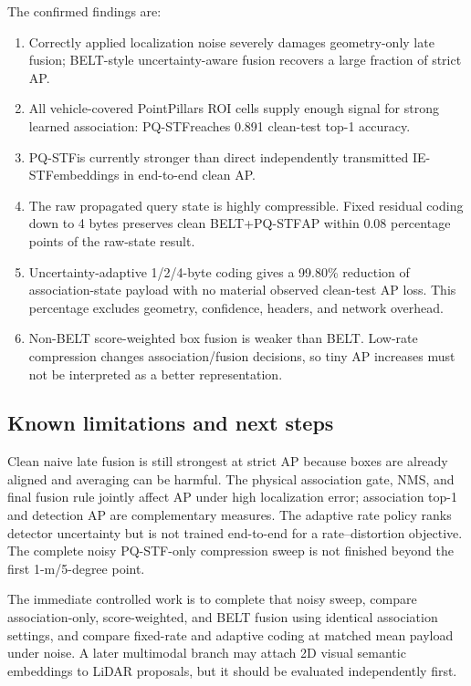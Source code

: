 \documentclass[11pt]{article}
\newcommand{\PQSTF}{\textsc{PQ-STF}}
\newcommand{\IESTF}{\textsc{IE-STF}}
\begin{document}
The confirmed findings are:
\begin{enumerate}
 \item Correctly applied localization noise severely damages geometry-only late fusion; BELT-style uncertainty-aware fusion recovers a large fraction of strict AP.
 \item All vehicle-covered PointPillars ROI cells supply enough signal for strong learned association: \PQSTF reaches 0.891 clean-test top-1 accuracy.
 \item \PQSTF is currently stronger than direct independently transmitted \IESTF embeddings in end-to-end clean AP.
 \item The raw propagated query state is highly compressible. Fixed residual coding down to 4 bytes preserves clean BELT+\PQSTF AP within 0.08 percentage points of the raw-state result.
 \item Uncertainty-adaptive 1/2/4-byte coding gives a 99.80\% reduction of association-state payload with no material observed clean-test AP loss. This percentage excludes geometry, confidence, headers, and network overhead.
 \item Non-BELT score-weighted box fusion is weaker than BELT. Low-rate compression changes association/fusion decisions, so tiny AP increases must not be interpreted as a better representation.
\end{enumerate}

\subsection{Known limitations and next steps}

Clean naive late fusion is still strongest at strict AP because boxes are already aligned and averaging can be harmful. The physical association gate, NMS, and final fusion rule jointly affect AP under high localization error; association top-1 and detection AP are complementary measures. The adaptive rate policy ranks detector uncertainty but is not trained end-to-end for a rate--distortion objective. The complete noisy \PQSTF-only compression sweep is not finished beyond the first 1-m/5-degree point.

The immediate controlled work is to complete that noisy sweep, compare association-only, score-weighted, and BELT fusion using identical association settings, and compare fixed-rate and adaptive coding at matched mean payload under noise. A later multimodal branch may attach 2D visual semantic embeddings to LiDAR proposals, but it should be evaluated independently first.
\end{document}
